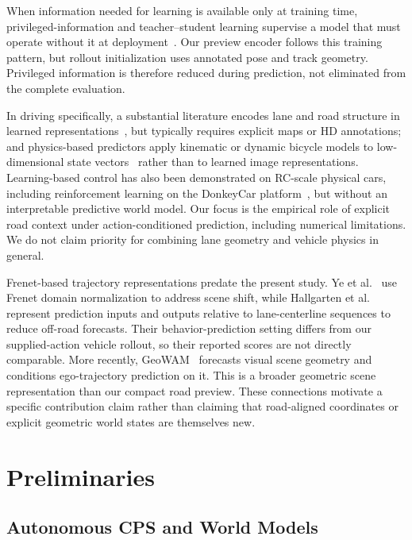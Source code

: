 \documentclass[preprint,12pt]{elsarticle}
\begin{document}
When information needed for learning is available only at training time,
privileged-information and teacher--student learning supervise a model that must
operate without it at deployment~\cite{chen2020learning, gou2021knowledge}.
Our preview encoder follows this training pattern, but rollout initialization
uses annotated pose and track geometry. Privileged information is therefore
reduced during prediction, not eliminated from the complete evaluation.

In driving specifically, a substantial literature encodes lane and road structure
in learned representations~\cite{salzmann2020trajectron++, itkina2023interpretable},
but typically requires explicit maps or HD annotations; and physics-based
predictors apply kinematic or dynamic bicycle models to low-dimensional state
vectors~\cite{kong2015kinematic} rather than to learned image representations.
Learning-based control has also been demonstrated on RC-scale physical cars,
including reinforcement learning on the DonkeyCar
platform~\cite{viitala2021learning}, but without an
interpretable predictive world model.
Our focus is the empirical role of explicit road context under action-conditioned
prediction, including numerical limitations. We do not claim priority for
combining lane geometry and vehicle physics in general.


Frenet-based trajectory representations predate the present study. Ye
et al.~\cite{ye2023frenet} use Frenet domain normalization to address scene
shift, while Hallgarten et al.~\cite{hallgarten2024stay} represent prediction
inputs and outputs relative to lane-centerline sequences to reduce off-road
forecasts. Their behavior-prediction setting differs from our supplied-action
vehicle rollout, so their reported scores are not directly comparable.
More recently, GeoWAM~\cite{lu2026geowam} forecasts visual scene geometry and
conditions ego-trajectory prediction on it. This is a broader geometric scene
representation than our compact road preview. These connections motivate a
specific contribution claim rather than claiming that road-aligned coordinates
or explicit geometric world states are themselves new.

\section{Preliminaries}\label{sec:preliminaries}

\subsection{Autonomous CPS and World Models}
\end{document}
